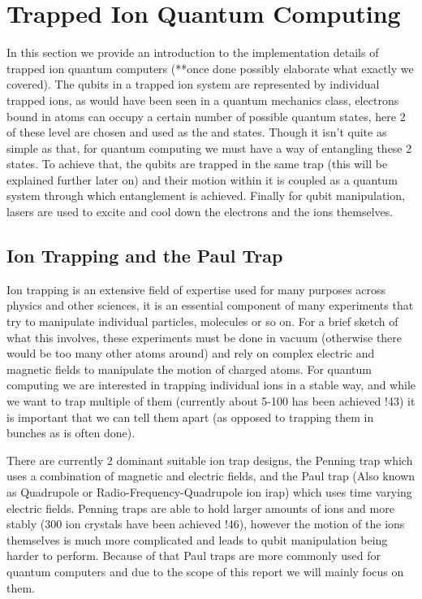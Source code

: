 
\section{Trapped Ion Quantum Computing}
In this section we provide an introduction to the implementation details of trapped ion quantum computers (**once done possibly elaborate what exactly we covered).
The qubits in a trapped ion system are represented by individual trapped ions, as would have been seen in a quantum mechanics class, electrons bound in atoms can occupy a certain number of possible quantum states, here 2 of these level are chosen and used as the \kz and \ko states.
Though it isn't quite as simple as that, for quantum computing we must have a way of entangling these 2 states.
To achieve that, the qubits are trapped in the same trap (this will be explained further later on) and their motion within it is coupled as a quantum system through which entanglement is achieved.
Finally for qubit manipulation, lasers are used to excite and cool down the electrons and the ions themselves.

\subsection{Ion Trapping and the Paul Trap}
Ion trapping is an extensive field of expertise used for many purposes across physics and other sciences, it is an essential component of many experiments that try to manipulate individual particles, molecules or so on.
For a brief sketch of what this involves, these experiments must be done in vacuum (otherwise there would be too many other atoms around) and rely on complex electric and magnetic fields to manipulate the motion of charged atoms.
For quantum computing we are interested in trapping individual ions in a stable way, and while we want to trap multiple of them (currently about 5-100 has been achieved !43) it is important that we can tell them apart (as opposed to trapping them in bunches as is often done).

There are currently 2 dominant suitable ion trap designs, the Penning trap which uses a combination of magnetic and electric fields, and the Paul trap (Also known as Quadrupole or Radio-Frequency-Quadrupole ion irap) which uses time varying electric fields.
Penning traps are able to hold larger amounts of ions and more stably (300 ion crystals have been achieved !46), however the motion of the ions themselves is much more complicated and leads to qubit manipulation being harder to perform.
Because of that Paul traps are more commonly used for quantum computers and due to the scope of this report we will mainly focus on them.

